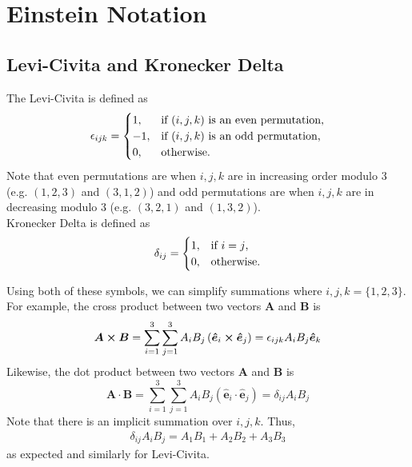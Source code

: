 \documentclass[oneside]{book}
\numberwithin{figure}{section}
\numberwithin{equation}{section}
\newcommand{\paren}[1]{\left(#1\right)}
\newcommand{\bhat}[1]{\bm{\hat{#1}}}
\newcommand{\eps}{\epsilon}
\theoremstyle{definition}
\begin{document}
	\chapter{Einstein Notation}
	\section{Levi-Civita and Kronecker Delta}\label{sec:lckd}
	The Levi-Civita is defined as
	\begin{equation}
		\eps_{ijk} = \begin{cases}
			1, & \text{if $ (i,j,k) $ is an even permutation,}\\
			-1, & \text{if $ (i,j,k) $ is an odd permutation,}\\
			0, & \text{otherwise.}
		\end{cases}
	\end{equation}
	Note that even permutations are when $ i,j,k $ are in increasing order modulo 3 (e.g. $ (1,2,3) $ and $ (3,1,2) $) and odd permutations are when $ i,j,k $ are in decreasing modulo 3 (e.g. $ (3,2,1) $ and $ (1,3,2) $).\\
	
	Kronecker Delta is defined as
	\begin{equation}
		\delta_{ij} = \begin{cases}
			1, & \text{if $ i = j $,}\\
			0, & \text{otherwise.}
		\end{cases}
	\end{equation}

	Using both of these symbols, we can simplify summations where $ i,j,k = \{1,2,3\} $. For example, the cross product between two vectors $ \bm{A} $ and $ \bm{B} $ is
	\begin{equation}
		\bm{A} \cross \bm{B} = \sum_{i = 1}^{3}\sum_{j = 1}^{3}A_iB_j\paren{\bhat{e}_i \cross \bhat{e}_j} = \eps_{ijk}A_iB_j\bhat{e}_k
	\end{equation}
	Likewise, the dot product between two vectors $ \bm{A} $ and $ \bm{B} $ is
	\begin{equation}
		\bm{A} \cdot \bm{B} = \sum_{i = 1}^{3}\sum_{j = 1}^{3}A_iB_j\paren{\bhat{e}_i \cdot \bhat{e}_j} = \delta_{ij}A_iB_j
	\end{equation}
	Note that there is an implicit summation over $ i,j,k $. Thus,
	\begin{align*}
		\delta_{ij}A_iB_j = A_1B_1 + A_2B_2 + A_3B_3
	\end{align*}
	as expected and similarly for Levi-Civita.
\end{document}
